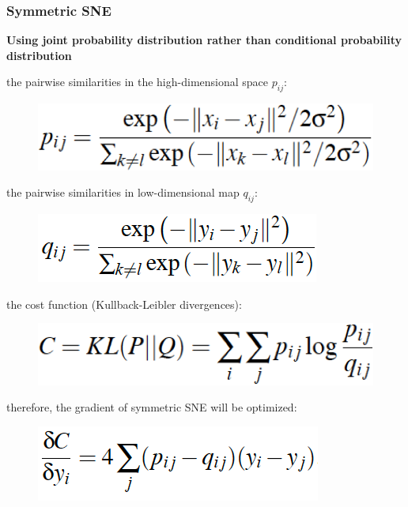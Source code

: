 \documentclass{beamer}
\begin{document}
% 
% 
% 
% 
% 
% 
\begin{frame}
  \frametitle{Symmetric SNE}

    \textbf{Using joint probability distribution rather than conditional probability distribution}

    the pairwise similarities in the high-dimensional space $p_{ij}$:
    \begin{figure}
        \centering
        \includegraphics[height=0.1\textheight]{images/equation2.png}
    \end{figure}
    the pairwise similarities in low-dimensional map $q_{ij}$:
    \begin{figure}
        \centering
        \includegraphics[height=0.1\textheight]{images/equation3.png}
    \end{figure}
    the cost function (Kullback-Leibler divergences):
    \begin{figure}
        \centering
        \includegraphics[height=0.1\textheight]{images/equation1.png}
    \end{figure}
    therefore, the gradient of symmetric SNE will be optimized:
    \begin{figure}
        \centering
        \includegraphics[height=0.1\textheight]{images/equation4.png}
    \end{figure}
\end{frame}
\end{document}
